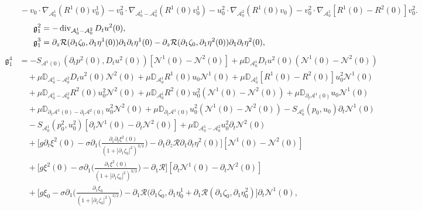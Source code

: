 \documentclass[letterpaper,reqno,10pt,twoside]{amsart}
\theoremstyle{definition}
\theoremstyle{remark}
\def\p{\partial}
\def\dive{\mathop{\rm div}\nolimits}
\begin{document}
\begin{appendix}
\[\begin{aligned}
				&\quad-v_0\cdot\nabla_{\mathcal{A}^1_0}(R^1(0)v^1_0)- v^2_0\cdot\nabla_{\mathcal{A}^1_0-\mathcal{A}^2_0}(R^1(0)v^1_0)-u^2_0\cdot\nabla_{\mathcal{A}^2_0}(R^1(0)v_0)-v^2_0\cdot\nabla_{\mathcal{A}^1_0}[R^1(0)-R^2(0)]v^2_0.
			\end{aligned}
			\]
			\[
			\begin{aligned}
				\mathfrak{g}^2_1&=-\dive_{\mathcal{A}_0^1-\mathcal{A}_0^2}D_tu^2(0),\\
				\mathfrak{g}^3_1&=\p_z\mathcal{R}(\p_1\zeta_0,\p_1\eta^1(0))\p_1\p_t\eta^1(0)-\p_z\mathcal{R}(\p_1\zeta_0,\p_1\eta^2(0))\p_1\p_t\eta^2(0),
			\end{aligned}
			\]
			\[
			\begin{aligned}
				\mathfrak{g}^4_1&=-S_{\mathcal{A}^1(0)}(\p_tp^2(0), D_tu^2(0))[\mathcal{N}^1(0)-\mathcal{N}^2(0)]+\mu\mathbb{D}_{\mathcal{A}_0^1}D_tu^2(0)(\mathcal{N}^1(0)-\mathcal{N}^2(0))\\
				&\quad+\mu\mathbb{D}_{\mathcal{A}_0^1-\mathcal{A}_0^2}D_tu^2(0)\mathcal{N}^2(0)+\mu\mathbb{D}_{\mathcal{A}_0^1}R^1(0)u_0\mathcal{N}^1(0)+\mu\mathbb{D}_{\mathcal{A}_0^1}[R^1(0)-R^2(0)]u_0^2\mathcal{N}^1(0)\\
				&\quad+\mu\mathbb{D}_{\mathcal{A}_0^1-\mathcal{A}_0^2}R^2(0)u^2_0\mathcal{N}^2(0)+\mu\mathbb{D}_{\mathcal{A}_0^1}R^2(0)u^2_0(\mathcal{N}^1(0)-\mathcal{N}^2(0))+\mu\mathbb{D}_{\p_t\mathcal{A}^1(0)}u_0\mathcal{N}^1(0)\\
				&\quad+\mu\mathbb{D}_{\p_t\mathcal{A}^1(0)-\p_t\mathcal{A}^2(0)}u^2_0\mathcal{N}^2(0)+\mu\mathbb{D}_{\p_t\mathcal{A}^1(0)}u^2_0(\mathcal{N}^1(0)-\mathcal{N}^2(0))-S_{\mathcal{A}^1_0}(p_0, u_0)\p_t\mathcal{N}^1(0)\\
				&\quad-S_{\mathcal{A}^1_0}(p^2_0, u^2_0)[\p_t\mathcal{N}^1(0)-\p_t\mathcal{N}^2(0)]+\mu\mathbb{D}_{\mathcal{A}_0^1-\mathcal{A}_0^2}u^2_0\p_t\mathcal{N}^2(0)\\
				&\quad+\bigg[g\p_t\xi^2(0)-\sigma\p_1\bigg(\frac{\p_1\p_t\xi^2(0)}{(1+|\p_1\zeta_0|^2)^{3/2}}\bigg)-\p_1 \p_z\mathcal{R}\p_1\p_t\eta^2(0)\bigg][\mathcal{N}^1(0)-\mathcal{N}^2(0)]\\
				&\quad+\bigg[g\xi^2(0)-\sigma\p_1\bigg(\frac{\p_1\xi^2(0)}{(1+|\p_1\zeta_0|^2)^{3/2}}\bigg)-\p_1 \mathcal{R}\bigg][\p_t\mathcal{N}^1(0)-\p_t\mathcal{N}^2(0)]\\
				&\quad+\bigg[g\xi_0-\sigma\p_1\bigg(\frac{\p_1\xi_0}{(1+|\p_1\zeta_0|^2)^{3/2}}\bigg)-\p_1 \mathcal{R}(\p_1\zeta_0,\p_1\eta^1_0+\p_1\mathcal{R}(\p_1\zeta_0,\p_1\eta^2_0)\bigg]\p_t\mathcal{N}^1(0),
			\end{aligned}
\]
\end{appendix}
\end{document}
